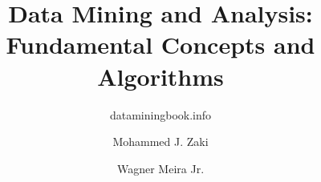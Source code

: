 \documentclass[10pt,xcolor=pst]{beamer}
\begin{document}
\title[Data Mining and Analysis]{Data Mining and Analysis:\\Fundamental Concepts and Algorithms}
\subtitle{dataminingbook.info}
\author[Zaki \& Meira Jr.]{Mohammed J. Zaki \and 
Wagner Meira Jr.}



\ifdefined\doxdata  \fi

\graphicspath{{./}{./EDA/data}{./EDA/numeric/}{./EDA/categorical/}{./EDA/datareduction/}{./EDA/highdim/}{./EDA/dimreduction/}{./EDA/densityestimation/}}
%
\ifdefined\doxnum  \fi
\ifdefined\doxcat  \fi
\ifdefined\doxgraph  \fi
\ifdefined\doxkernel  \fi
\ifdefined\doxhighdim  \fi
\ifdefined\doxdimred  \fi

\graphicspath{{./FPM/fpmover/}{./FPM/itemsets/}{./FPM/sumrep/}{./FPM/sequences/}{./FPM/graphs/}{./FPM/fpmeval/}}
%
\ifdefined\doxitemsets  \fi
\ifdefined\doxsumrep  \fi
\ifdefined\doxsequences  \fi
\ifdefined\doxgraphs  \fi
\ifdefined\doxfpmeval  \fi

\graphicspath{{./CLUST/overview/}{./CLUST/density/}{./CLUST/representative/}{./CLUST/hierarchical/}{./CLUST/subspace/}{./CLUST/eval/}}
%
\ifdefined\doxrep  \fi
\ifdefined\doxhier  \fi
\ifdefined\doxdens  \fi
\ifdefined\doxspectral  \fi
\ifdefined\doxclusteval  \fi


\graphicspath{{./CLASS/overview/}{./CLASS/instance/}{./CLASS/decisiontrees/}{./CLASS/rules/}{./CLASS/probabilistic/}{./CLASS/svm/}{./CLASS/eval/}{./CLASS/lda/}}
%
\ifdefined\doxprob  \fi
\ifdefined\doxdectrees  \fi
\ifdefined\doxlda  \fi
\ifdefined\doxsvm  \fi
\ifdefined\doxclasseval  \fi

\begin{frame}
\titlepage
\end{frame}
\end{document}
